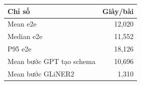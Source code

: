 \begin{tabularx}{\linewidth}{@{}Yr@{}}
\toprule
\textbf{Chỉ số} & \textbf{Giây/bài} \\\midrule
Mean e2e & 12,020 \\
Median e2e & 11,552 \\
P95 e2e & 18,126 \\
Mean bước GPT tạo schema & 10,696 \\
Mean bước GLiNER2 & 1,310 \\
\bottomrule
\end{tabularx}
